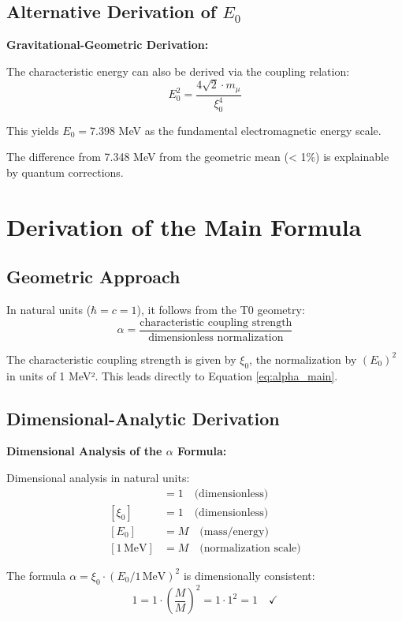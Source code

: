 \documentclass[12pt,a4paper]{article}
\newcommand{\xipar}{\xi_0}
\newcommand{\Ezero}{E_0}
\begin{document}
	\subsection{Alternative Derivation of $\Ezero$}
	
	\begin{alternative}
		\textbf{Gravitational-Geometric Derivation:}
		
		The characteristic energy can also be derived via the coupling relation:
		\begin{equation}
			\Ezero^2 = \frac{4\sqrt{2} \cdot m_\mu}{\xipar^4}
		\end{equation}
		
		This yields $\Ezero = 7.398$ MeV as the fundamental electromagnetic energy scale.
		
		The difference from 7.348 MeV from the geometric mean (< 1\%) is explainable by quantum corrections.
	\end{alternative}
	
	\section{Derivation of the Main Formula}
	
	\subsection{Geometric Approach}
	
	In natural units ($\hbar = c = 1$), it follows from the T0 geometry:
	\begin{equation}
		\alpha = \frac{\text{characteristic coupling strength}}{\text{dimensionless normalization}}
		\label{eq:alpha_geometric}
	\end{equation}
	
	The characteristic coupling strength is given by $\xipar$, the normalization by $(\Ezero)^2$ in units of 1 MeV². This leads directly to Equation \eqref{eq:alpha_main}.
	
	\subsection{Dimensional-Analytic Derivation}
	
	\begin{foundation}
		\textbf{Dimensional Analysis of the $\alpha$ Formula:}
		
		Dimensional analysis in natural units:
		\begin{align}
			[\alpha] &= 1 \quad \text{(dimensionless)}\\
			[\xipar] &= 1 \quad \text{(dimensionless)}\\
			[\Ezero] &= M \quad \text{(mass/energy)}\\
			[1\,\text{MeV}] &= M \quad \text{(normalization scale)}
		\end{align}
		
		The formula $\alpha = \xipar \cdot (\Ezero/1\,\text{MeV})^2$ is dimensionally consistent:
		\begin{equation}
			1 = 1 \cdot \left(\frac{M}{M}\right)^2 = 1 \cdot 1^2 = 1 \quad \checkmark
		\end{equation}
	\end{foundation}
	
\end{document}
